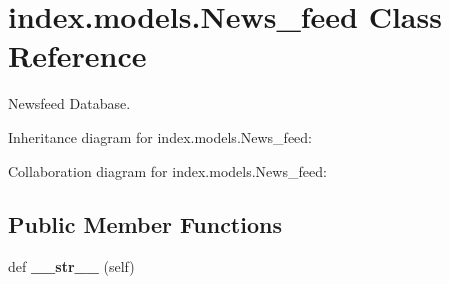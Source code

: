 \hypertarget{classindex_1_1models_1_1News__feed}{}\section{index.\+models.\+News\+\_\+feed Class Reference}
\label{classindex_1_1models_1_1News__feed}


Newsfeed Database.  




Inheritance diagram for index.\+models.\+News\+\_\+feed\+:


Collaboration diagram for index.\+models.\+News\+\_\+feed\+:
\subsection*{Public Member Functions}
\begin{DoxyCompactItemize}
\item 
\mbox{\label{classindex_1_1models_1_1News__feed_a2ef174f61716be2bed535c26d34812a0}} 
def {\bfseries \+\_\+\+\_\+str\+\_\+\+\_\+} (self)
\end{DoxyCompactItemize}
